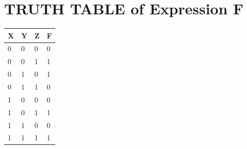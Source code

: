 \documentclass{report}
\begin{document}
\newpage
\section{TRUTH TABLE of Expression F}


\begin{table}[]\centering
    \begin{tabular}{|l|l|l|l|}
         \hline
        X & Y & Z & F  \\ \hline
        0 & 0 & 0     & 0  \\
        0 & 0 & 1     & 1  \\
        0 & 1 & 0     & 1   \\ 
        0 & 1 & 1     & 0   \\
        1 & 0 & 0     & 0   \\
        1 & 0 & 1     & 1   \\
        1 & 1 & 0     & 0   \\
        1 & 1 & 1     & 1    \\ 
        \hline

\end{tabular}
\end{table}
\end{document}
